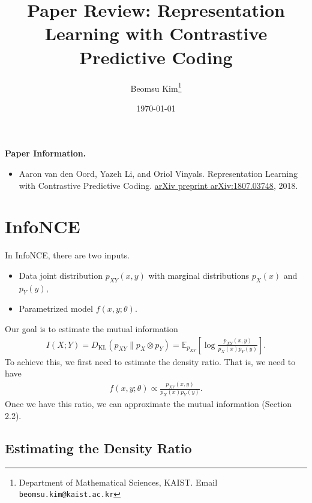 \documentclass[11pt]{article}
\title{Paper Review: Representation Learning with Contrastive Predictive Coding}
\author{Beomsu Kim\footnote{Department of Mathematical Sciences, KAIST. Email \texttt{beomsu.kim@kaist.ac.kr}}}
\date{\today}
\newcommand{\EE}{\mathbb{E}}
\newcommand{\KL}{D_{\text{KL}}}
\begin{document}
\maketitle

\textbf{Paper Information.}

\begin{itemize}
\item Aaron van den Oord, Yazeh Li, and Oriol Vinyals. Representation Learning with Contrastive Predictive Coding. \underline{arXiv preprint arXiv:1807.03748}, 2018.
\end{itemize}

\section{InfoNCE}

In InfoNCE, there are two inputs.
\begin{itemize}
\item Data joint distribution $p_{XY}(x,y)$ with marginal distributions $p_X(x)$ and $p_Y(y)$,
\item Parametrized model $f(x,y;\theta)$.
\end{itemize}
Our goal is to estimate the mutual information
\begin{align*}
I(X;Y) = \KL(p_{XY} \| p_X \otimes p_Y) = \EE_{p_{XY}} \left[ \log \frac{p_{XY}(x,y)}{p_X(x)p_Y(y)} \right].
\end{align*}
To achieve this, we first need to estimate the density ratio. That is, we need to have
\begin{align*}
f(x,y;\theta) \propto \frac{p_{XY}(x,y)}{p_X(x)p_Y(y)}.
\end{align*}
Once we have this ratio, we can approximate the mutual information (Section 2.2).

\newpage

\subsection{Estimating the Density Ratio}
\end{document}

